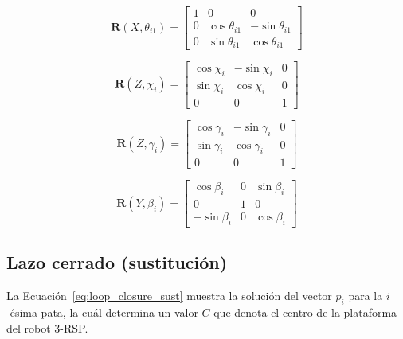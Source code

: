 \documentclass[titlepage, letterpaper, fleqn]{article}
\let\bs\mathbf
\begin{document}
\begin{equation}
    \label{eq:rot_X_theta}
    \bs{R}(X,\theta_{i1}) =
    \begin{bmatrix}
        1 & 0 & 0 \\
        0 & \cos\theta_{i1} & -\sin\theta_{i1} \\
        0 & \sin\theta_{i1} & \cos\theta_{i1}
    \end{bmatrix}
\end{equation}

\begin{equation}
    \label{eq:rot_Z_chi}
    \bs{R}(Z,\chi_i) =
    \begin{bmatrix}
    \cos\chi_i & -\sin\chi_i & 0 \\
    \sin\chi_i & \cos\chi_i & 0 \\
    0 & 0 & 1
    \end{bmatrix}
\end{equation}

\begin{equation}
    \label{eq:rot_Z_gamma}
    \bs{R}(Z,\gamma_i) = 
    \begin{bmatrix}
    \cos\gamma_i & -\sin\gamma_i & 0 \\
    \sin\gamma_i & \cos\gamma_i & 0 \\
    0 & 0 & 1
    \end{bmatrix}
\end{equation}

\begin{equation}
    \label{eq:rot_Y_beta}
    \bs{R}(Y,\beta_i) =
    \begin{bmatrix}
    \cos\beta_i & 0 & \sin\beta_i \\
    0 & 1 & 0 \\
    -\sin\beta_i & 0 &\cos\beta_i
    \end{bmatrix}
\end{equation}


\subsection{Lazo cerrado (sustitución)} %
\label{sec:loop_closure_sust}

La Ecuación~\ref{eq:loop_closure_sust} muestra la solución del vector $p_i$ para la $i$-ésima pata,
la cuál determina un valor $C$ que denota el centro de la plataforma del robot 3-RSP.
\end{document}

